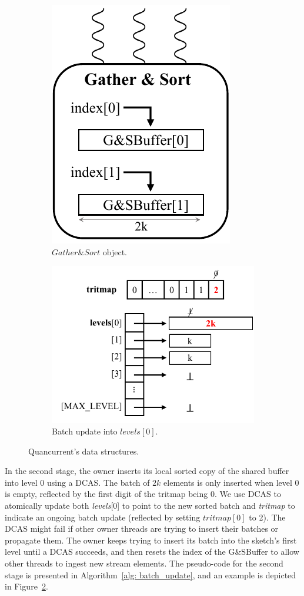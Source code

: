 \begin{figure}[h]
    \begin{subfigure}[b]{\linewidth}
    \centering
    \includegraphics[width=0.3\linewidth]{graphics/algorithm/gather_and_sort.pdf}
    \caption{$\mathit{Gather\&Sort}$ object.}
    \label{fig: gather_and_sort}
    \end{subfigure}
    \par\medskip
    \begin{subfigure}[b]{\linewidth}
    \centering
    \includegraphics[width=0.5\linewidth]{graphics/algorithm/batch_update.pdf}
    \caption{Batch update into $\mathit{levels}[0]$.}
    \label{fig: batch_update}
    \end{subfigure}%
    
    \caption{Quancurrent's data structures.}
    \label{fig: data_structures}
\end{figure}




In the second stage, the owner inserts its local sorted copy of the shared buffer into level $0$ using a DCAS. The batch of $2k$ elements is only inserted when level $0$ is empty, reflected by the first digit of the tritmap being $0$. We use DCAS to atomically update both \emph{levels}[0] to point to the new sorted batch and \emph{tritmap} to indicate an ongoing batch update (reflected by setting $\mathit{tritmap[0]}$ to 2). The DCAS might fail if other owner threads are trying to insert their batches or propagate them. The owner keeps trying to insert its batch into the sketch's first level until a DCAS succeeds, and then resets the index of the G\&SBuffer to allow other threads to ingest new stream elements. 
The pseudo-code for the second stage is presented in Algorithm~\ref{alg: batch_update}, and an example is depicted in Figure~\ref{fig: batch_update}.

